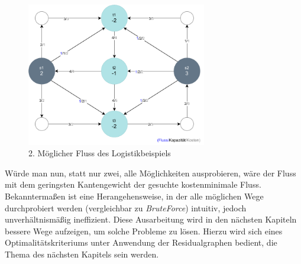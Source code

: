 \begin{figure}[htb]
\centering
\includegraphics[width=0.7\textwidth]{img/philipp/graph1-example 2.drawio.pdf}
\caption{2. Möglicher Fluss des Logistikbeispiels}
\label{fig:baeckerbeispiel_loesungen2}
\end{figure}

Würde man nun, statt nur zwei, alle Möglichkeiten ausprobieren, wäre der Fluss mit dem geringsten Kantengewicht der gesuchte kostenminimale Fluss. \\
Bekanntermaßen ist eine Herangehensweise, in der alle möglichen Wege durchprobiert werden (vergleichbar zu \textit{BruteForce}) intuitiv, jedoch unverhältnismäßig ineffizient. Diese Ausarbeitung wird in den nächsten Kapiteln bessere Wege aufzeigen, um solche Probleme zu lösen. Hierzu wird sich eines Optimalitätskriteriums unter Anwendung der Residualgraphen bedient, die Thema des nächsten Kapitels sein werden.